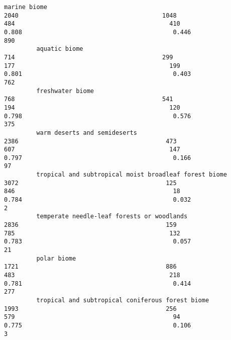 \documentclass{article}
\begin{document}
\begin{Verbatim}[commandchars=\\\{\}]
         marine biome                                                                                      2040                                        1048                                                484                                           410                                    0.808                                          0.446                890
         aquatic biome                                                                                      714                                         299                                                177                                           199                                    0.801                                          0.403                762
         freshwater biome                                                                                   768                                         541                                                194                                           120                                    0.798                                          0.576                375
         warm deserts and semideserts                                                                      2386                                         473                                                607                                           147                                    0.797                                          0.166                 97
         tropical and subtropical moist broadleaf forest biome                                             3072                                         125                                                846                                            18                                    0.784                                          0.032                  2
         temperate needle-leaf forests or woodlands                                                        2836                                         159                                                785                                           132                                    0.783                                          0.057                 21
         polar biome                                                                                       1721                                         886                                                483                                           218                                    0.781                                          0.414                277
         tropical and subtropical coniferous forest biome                                                  1993                                         256                                                579                                            94                                    0.775                                          0.106                  3

\end{Verbatim}
\end{document}
